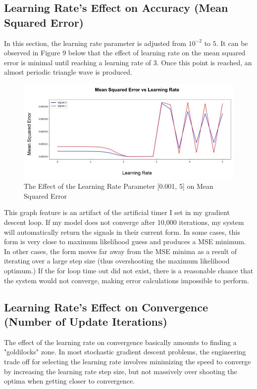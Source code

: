 \documentclass[12pt]{article}
\begin{document}
\subsection{Learning Rate's Effect on Accuracy (Mean Squared Error)}
In this section, the learning rate parameter is adjusted from \(10^{-2}\) to \(5\). It can be observed in Figure 9 below that the effect of learning rate on the mean squared error is minimal until reaching a learning rate of 3. Once this point is reached, an almost periodic triangle wave is produced. 
\begin{figure}[!htb] %
  \centering
  \includegraphics[width = \linewidth]{MSE_2.jpg}
  \caption{The Effect of the Learning Rate Parameter [0.001, 5] on Mean Squared Error}
\end{figure}
\FloatBarrier
\bigbreak
\noindent
This graph feature is an artifact of the artificial timer I set in my gradient descent loop. If my model does not converge after 10,000 iterations, my system will automatically return the signals in their current form. In some cases, this form is very close to maximum likelihood guess and produces a MSE minimum. In other cases, the form moves far away from the MSE minima as a result of iterating over a large step size (thus overshooting the maximum likelihood optimum.)
\bigbreak
\noindent
If the for loop time out did not exist, there is a reasonable chance that the system would not converge, making error calculations impossible to perform.
\subsection{Learning Rate's Effect on Convergence (Number of Update Iterations)}
The effect of the learning rate on convergence basically amounts to finding a "goldilocks" zone. In most stochastic gradient descent problems, the engineering trade off for selecting the learning rate involves minimizing the speed to converge by increasing the learning rate step size, but not massively over shooting the optima when getting closer to convergence. 
 
\end{document}
